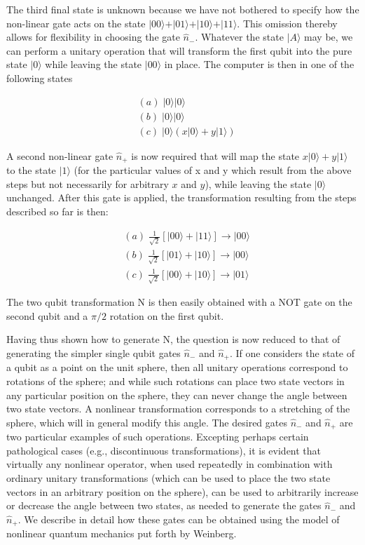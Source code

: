 \documentclass[12pt]{article}
\begin{document}
The third final state is unknown because we have not bothered to specify how
the non-linear gate acts on the state $\vert 00 \rangle + \vert 01 \rangle + \vert 10 \rangle + \vert 11 \rangle$. This omission thereby allows for flexibility in choosing the gate
$\widehat{n}_{-}$. Whatever the state $\vert A \rangle$
may be, we can perform a unitary operation that will transform the first qubit
into the pure state $\vert 0 \rangle$
while leaving the state $\vert 00 \rangle$
in place. The computer is then in one of the following states%

\begin{align}
&  (a)\;|0\rangle|0\rangle\nonumber\\
&  (b)\;|0\rangle|0\rangle\\
&  (c)\;|0\rangle(x|0\rangle+y|1\rangle)\nonumber
\end{align}

A second non-linear gate $\widehat{n}_{+}$ is now required that will map the
state $x \vert 0 \rangle + y \vert 1 \rangle$%
to the state $\vert 1 \rangle$ (for the particular values of x and y which result from the above steps but
not necessarily for arbitrary $x$ and $y$), while leaving the state $\vert 0 \rangle$
unchanged. After this gate is applied, the transformation resulting from the
steps described so far is then:

\begin{align}
&  (a)\;\frac{1}{\sqrt{2}}\left[  |00\rangle+|11\rangle\right]
\longrightarrow|00\rangle\nonumber\\
&  (b)\;\frac{1}{\sqrt{2}}\left[  |01\rangle+|10\rangle\right]
\longrightarrow|00\rangle\\
&  (c)\;\frac{1}{\sqrt{2}}\left[  |00\rangle+|10\rangle\right]
\longrightarrow|01\rangle\nonumber
\end{align}

The two qubit transformation N is then easily obtained with a NOT gate on the
second qubit and a $\pi/2$ rotation on the first qubit.\ 

Having thus shown how to generate N, the question is now reduced to that of
generating the simpler single qubit gates $\widehat{n}_{-}$ and $\widehat
{n}_{+}$. If one considers the state of a qubit as a point on the unit sphere,
then all unitary operations correspond to rotations of the sphere; and while
such rotations can place two state vectors in any particular position on the
sphere, they can never change the angle between two state vectors. A nonlinear
transformation corresponds to a stretching of the sphere, which will in
general modify this angle. The desired gates $\widehat{n}_{-}$ and
$\widehat{n}_{+}$ are two particular examples of such operations. Excepting
perhaps certain pathological cases (e.g., discontinuous transformations), it
is evident that virtually any nonlinear operator, when used repeatedly in
combination with ordinary unitary transformations (which can be used to place
the two state vectors in an arbitrary position on the sphere), can be used to
arbitrarily increase or decrease the angle between two states, as needed to
generate the gates $\widehat{n}_{-}$ and $\widehat{n}_{+}$. We describe in
detail how these gates can be obtained using the model of nonlinear quantum
mechanics put forth by Weinberg.
\end{document}
